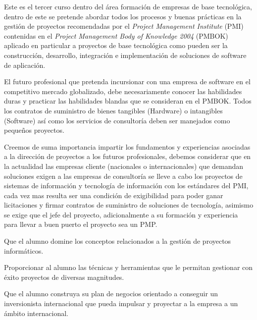 \begin{syllabus}


\begin{justification}
Este es el tercer curso dentro del área formación de empresas de base tecnológica, 
dentro de este se pretende abordar todos los procesos y buenas prácticas en la 
gestión de proyectos recomendadas por el \textit{Project Management Institute} (PMI) 
contenidas en el \textit{Project Management Body of Knowledge 2004} (PMBOK)  
aplicado en particular a proyectos de base tecnológica como pueden ser la 
construcción, desarrollo, integración e implementación de soluciones de 
software de aplicación.

El futuro profesional que pretenda incursionar con una empresa de 
software en el competitivo mercado globalizado, debe necesariamente 
conocer las habilidades duras y practicar las habilidades blandas que se 
consideran en el PMBOK. Todos los contratos de suministro de bienes 
tangibles (Hardware) o intangibles (Software) así como los servicios de 
consultoría deben ser manejados como pequeños proyectos.

Creemos de suma importancia impartir los fundamentos y experiencias 
asociadas a la dirección de proyectos a los futuros profesionales, 
debemos considerar que en la actualidad las empresas cliente 
(nacionales o internacionales) que demandan soluciones exigen a 
las empresas de consultoría se lleve a cabo los proyectos de sistemas 
de información y tecnología de información con los estándares del PMI, 
cada vez mas resulta ser una condición de exigibilidad para poder ganar 
licitaciones y firmar contratos de suministro de soluciones de tecnología, 
asimismo se exige que el jefe del proyecto, adicionalmente a su formación y 
experiencia para llevar a buen puerto el proyecto sea un PMP.
\end{justification}

\begin{goals}
\item Que el alumno domine los conceptos relacionados a la gestión de proyectos informáticos.
\item Proporcionar al alumno las técnicas y herramientas que le permitan gestionar con éxito proyectos de diversas magnitudes.
\item Que el alumno construya su plan de negocios orientado a conseguir un inversionista internacional que pueda impulsar y proyectar a la empresa a un ámbito internacional.
\end{goals}


\end{syllabus}
